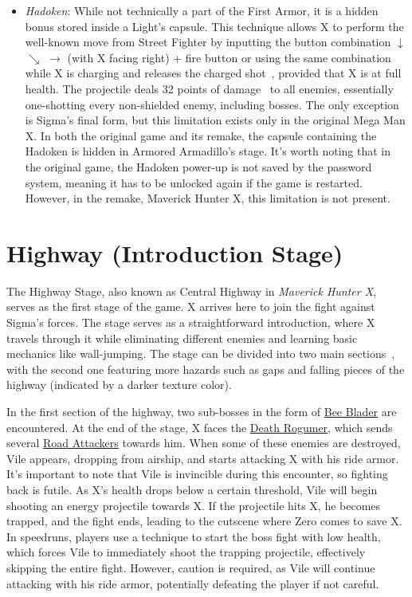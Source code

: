 \begin{itemize}
\item \emph{Hadoken}: While not technically a part of the First Armor, it is a hidden bonus stored inside a Light's capsule. This technique allows X to perform the well-known move from Street Fighter by inputting the button combination $\downarrow$ $\searrow$ $\rightarrow$ (with X facing right) + fire button or using the same combination while X is charging and releases the charged shot~\cite{RTA_wiki:X1}, provided that X is at full health. The projectile deals 32 points of damage~\cite{wiki:Hadoken} to all enemies, essentially one-shotting every non-shielded enemy, including bosses. The only exception is Sigma's final form, but this limitation exists only in the original Mega Man X. In both the original game and its remake, the capsule containing the Hadoken is hidden in Armored Armadillo's stage. It's worth noting that in the original game, the Hadoken power-up is not saved by the password system, meaning it has to be unlocked again if the game is restarted. However, in the remake, Maverick Hunter X, this limitation is not present.
\end{itemize}


\section{Highway (Introduction Stage)}

The Highway Stage, also known as Central Highway in \textit{Maverick Hunter X}, serves as the first stage of the game. X arrives here to join the fight against Sigma's forces. The stage serves as a straightforward introduction, where X travels through it while eliminating different enemies and learning basic mechanics like wall-jumping. The stage can be divided into two main sections~\cite{stratwiki:HighWay}, with the second one featuring more hazards such as gaps and falling pieces of the highway (indicated by a darker texture color).

In the first section of the highway, two sub-bosses in the form of \hyperlink{miniboss:Bee_Blader}{Bee Blader} are encountered. At the end of the stage, X faces the \hyperlink{vehicle:Death_Rogumer}{Death Rogumer}, which sends several \hyperlink{enem:Road_Attackers}{Road Attackers} towards him. When some of these enemies are destroyed, Vile appears, dropping from  airship, and starts attacking X with his ride armor. It's important to note that Vile is invincible during this encounter, so fighting back is futile. As X's health drops below a certain threshold, Vile will begin shooting an energy projectile towards X. If the projectile hits X, he becomes trapped, and the fight ends, leading to the cutscene where Zero comes to save X. In speedruns, players use a technique to start the boss fight with low health, which forces Vile to immediately shoot the trapping projectile, effectively skipping the entire fight. However, caution is required, as Vile will continue attacking with his ride armor, potentially defeating the player if not careful.

